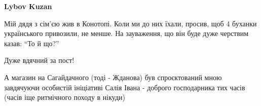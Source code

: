 \begin{itemize}
\begin{itemize} %
\textbf{Lybov Kuzan} 

Мій дядя з сім'єю жив в Конотопі. Коли ми до них їхали, просив, щоб 4 буханки
українського привозили, не менше. На зауваження, що він буде дуже черствим
казав: \enquote{То й що?}

\end{itemize} %

Дуже вдячний за пост!

А магазин на Сагайдачного (тоді - Жданова) був спроєктований мною завдячуючи
особистій ініціативі Салія Івана - доброго господарника тих часів (часів іще
ритмічного походу в нікуди)

\end{itemize} %
